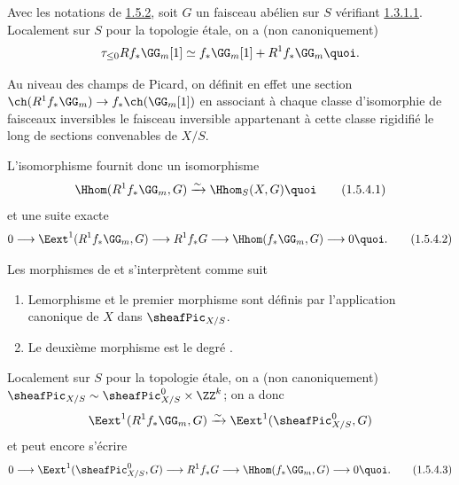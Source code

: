 \subsubsection{}
Avec les notations de \hyperref[XVIII.thm1.5.2]{1.5.2}, soit $G$ un faisceau
abélien sur $S$ 
vérifiant \hyperref[XVIII.par1.3.1.1]{1.3.1.1}. Localement sur $S$ pour la topologie
étale, on a (non canoniquement)
$$
\tau_{\leq 0}
Rf_{\ast}\GG_{m}[1]\simeq
f_{\ast}\GG_{m}[1]+R^{1}f_{\ast}\GG_{m}{\quoi}.
$$

Au niveau des champs de Picard, on définit en effet une section
$\ch(R^{1}f_{\ast}\GG_{m})\rightarrow
f_{\ast}\ch(\GG_{m}[1])$ en associant à chaque classe
d'isomorphie de faisceaux inversibles le faisceau inversible
appartenant à cette classe rigidifié le long de sections convenables
de $X/S$.

L'isomorphisme  fournit donc un isomorphisme
\begin{equation*}
\Hhom(R^{1}f_{\ast}\GG_{m},G)\xrightarrow{\sim}\Hhom_{S}(X,G){\quoi}\tag{1.5.4.1}
\end{equation*}%
et une suite exacte
\begin{equation*}
0\longrightarrow
\Eext^{1}(R^{1}f_{\ast}\GG_{m},G)\longrightarrow
R^1f_{\ast}G\longrightarrow
\Hhom(f_{\ast}\GG_{m},G)\longrightarrow 0{\quoi}.\tag{1.5.4.2}
\end{equation*}

Les morphismes de  et  s'interprètent
comme suit  
\begin{enumerate}
\renewcommand{\theenumi}{\alph{enumi}}
\renewcommand{\labelenumi}{\theenumi)}
\item Le\pageoriginale morphisme  et le premier
  morphisme  sont définis par l'application canonique
  de $X$ dans $\sheafPic_{X/S}$.

\item Le deuxième morphisme  est le degré .
\end{enumerate}

Localement sur $S$ pour la topologie étale, on a (non canoniquement)
$\sheafPic_{X/S}\sim \sheafPic^{0}_{X/S}\times \ZZ^{k}$; on a donc
$$
\Eext^{1}(R^{1}f_{\ast}\GG_{m},G)\xrightarrow{\sim}\Eext^{1}(\sheafPic^{0}_{X/S}, G)
$$
et  peut encore s'écrire
\begin{equation*}
0 \longrightarrow \Eext^{1}(\sheafPic^{0}_{X/S},G)\longrightarrow
R^{1}f_{\ast}G\longrightarrow
\Hhom(f_{\ast}\GG_{m},G)\longrightarrow 0{\quoi}.\tag{1.5.4.3}
\end{equation*}

